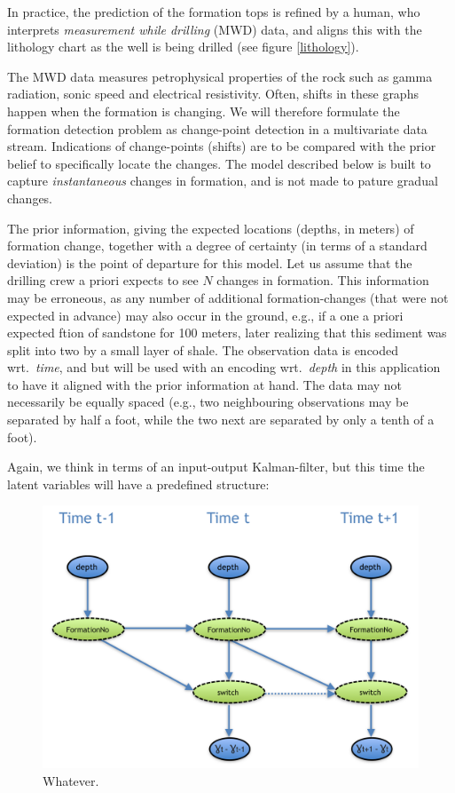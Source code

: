 In practice, the prediction of the formation tops is refined by a human, who interprets  {\em measurement while drilling} (MWD) data, and aligns this with the lithology chart as the well is being drilled (see figure \ref{lithology}).

The MWD data measures petrophysical properties of the rock such as gamma radiation, sonic speed and electrical resistivity. 
Often, shifts in these graphs happen when the formation is changing. We will therefore formulate the formation detection problem as change-point detection in a multivariate data stream. 
Indications of change-points (shifts) are to be compared with the prior belief to specifically locate the changes. The model described below is built to capture \textit{instantaneous} changes in formation, and is not made to pature gradual changes. 

The prior information, giving the expected locations (depths, in meters) of formation change, together with a degree of certainty (in terms of a standard deviation) is the point of departure for this model. Let us assume that the drilling crew a priori expects  to see $N$ changes in formation. 
This information may be erroneous, as any number of additional formation-changes (that were not expected in advance) may also occur in the ground, e.g., if a one a priori expected ftion of sandstone for 100 meters, later realizing that this sediment was split into two by a small layer of shale.
The observation data is encoded wrt.\ \textit{time}, and but will be used with an encoding wrt.\ \textit{depth} in this application to have it aligned with the prior information at hand. The data may not necessarily be equally spaced (e.g., two neighbouring observations may be separated by half a foot, while the two next are separated by only a tenth of a foot). 
 
Again, we think in terms of an input-output Kalman-filter, but this time the latent variables will have a predefined structure:

\begin{figure}
\begin{center}
\includegraphics[scale=0.5]{./figures/VT_Scenario3} 
\caption{\label{Figure:VTEraticTorqueMarked}  Whatever.}
\end{center}
\end{figure}

